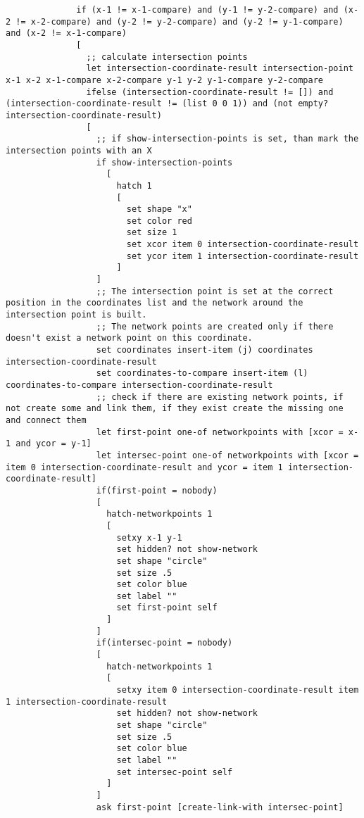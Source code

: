 \begin{lstlisting}
              if (x-1 != x-1-compare) and (y-1 != y-2-compare) and (x-2 != x-2-compare) and (y-2 != y-2-compare) and (y-2 != y-1-compare) and (x-2 != x-1-compare)
              [
                ;; calculate intersection points
                let intersection-coordinate-result intersection-point x-1 x-2 x-1-compare x-2-compare y-1 y-2 y-1-compare y-2-compare
                ifelse (intersection-coordinate-result != []) and (intersection-coordinate-result != (list 0 0 1)) and (not empty? intersection-coordinate-result)
                [
                  ;; if show-intersection-points is set, than mark the intersection points with an X
                  if show-intersection-points
                    [
                      hatch 1
                      [
                        set shape "x"
                        set color red
                        set size 1
                        set xcor item 0 intersection-coordinate-result
                        set ycor item 1 intersection-coordinate-result
                      ]
                  ]        
                  ;; The intersection point is set at the correct position in the coordinates list and the network around the intersection point is built.
                  ;; The network points are created only if there doesn't exist a network point on this coordinate.                  
                  set coordinates insert-item (j) coordinates intersection-coordinate-result
                  set coordinates-to-compare insert-item (l) coordinates-to-compare intersection-coordinate-result
                  ;; check if there are existing network points, if not create some and link them, if they exist create the missing one and connect them
                  let first-point one-of networkpoints with [xcor = x-1 and ycor = y-1]
                  let intersec-point one-of networkpoints with [xcor = item 0 intersection-coordinate-result and ycor = item 1 intersection-coordinate-result]
                  if(first-point = nobody)
                  [
                    hatch-networkpoints 1
                    [
                      setxy x-1 y-1
                      set hidden? not show-network
                      set shape "circle"
                      set size .5
                      set color blue
                      set label ""
                      set first-point self
                    ]
                  ]
                  if(intersec-point = nobody)
                  [
                    hatch-networkpoints 1
                    [
                      setxy item 0 intersection-coordinate-result item 1 intersection-coordinate-result
                      set hidden? not show-network
                      set shape "circle"
                      set size .5
                      set color blue
                      set label ""
                      set intersec-point self
                    ]
                  ] 
                  ask first-point [create-link-with intersec-point]                  
                  

\end{lstlisting}
